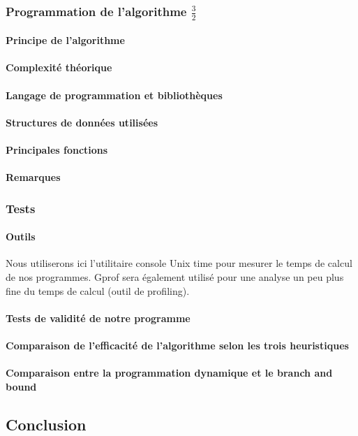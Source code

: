 \documentclass[a4paper, 12pt]{article}
\begin{document}
\subsubsection{Programmation de l'algorithme $\frac{3}{2}$}

\paragraph{Principe de l'algorithme}

\paragraph{Complexité théorique}

\paragraph{Langage de programmation et bibliothèques}

\paragraph{Structures de données utilisées}

\paragraph{Principales fonctions}

\paragraph{Remarques}

\subsubsection{Tests}

\paragraph{Outils}

Nous utiliserons ici l'utilitaire console Unix time pour mesurer le
temps de calcul de nos programmes. Gprof sera également utilisé pour
une analyse un peu plus fine du temps de calcul (outil de profiling).

\paragraph{Tests de validité de notre programme}

\paragraph{Comparaison de l'efficacité de l'algorithme selon les
  trois heuristiques}


\paragraph{Comparaison entre la programmation dynamique et le branch and bound}

\subsection{Conclusion}
\end{document}
